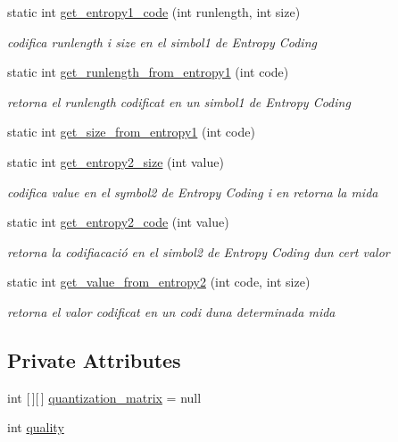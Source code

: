 \begin{DoxyCompactItemize}
static int \hyperlink{classdomini_1_1algorithm_1_1JPEG_a0f897c6c525d81551539df1eb8db7e12}{get\+\_\+entropy1\+\_\+code} (int runlength, int size)
\begin{DoxyCompactList}\small\item\em codifica runlength i size en el simbol1 de Entropy Coding \end{DoxyCompactList}\item 
static int \hyperlink{classdomini_1_1algorithm_1_1JPEG_ac58cb434a7acfd90fc8e548fd7c00ae2}{get\+\_\+runlength\+\_\+from\+\_\+entropy1} (int code)
\begin{DoxyCompactList}\small\item\em retorna el runlength codificat en un simbol1 de Entropy Coding \end{DoxyCompactList}\item 
static int \hyperlink{classdomini_1_1algorithm_1_1JPEG_a8d1005fb7833d36a064afb1c5e15bbd3}{get\+\_\+size\+\_\+from\+\_\+entropy1} (int code)
\item 
static int \hyperlink{classdomini_1_1algorithm_1_1JPEG_aa9bc9bee7181efee254be843e23ee2c6}{get\+\_\+entropy2\+\_\+size} (int value)
\begin{DoxyCompactList}\small\item\em codifica value en el symbol2 de Entropy Coding i en retorna la mida \end{DoxyCompactList}\item 
static int \hyperlink{classdomini_1_1algorithm_1_1JPEG_a0ccbcda5311dc96a30e5cb7f2a5b95b5}{get\+\_\+entropy2\+\_\+code} (int value)
\begin{DoxyCompactList}\small\item\em retorna la codifiacació en el simbol2 de Entropy Coding d\textquotesingle{}un cert valor \end{DoxyCompactList}\item 
static int \hyperlink{classdomini_1_1algorithm_1_1JPEG_a41c69fe2e29999dd17a555859df22530}{get\+\_\+value\+\_\+from\+\_\+entropy2} (int code, int size)
\begin{DoxyCompactList}\small\item\em retorna el valor codificat en un codi d\textquotesingle{}una determinada mida \end{DoxyCompactList}\end{DoxyCompactItemize}
\subsection*{Private Attributes}
\begin{DoxyCompactItemize}
\item 
int \mbox{[}$\,$\mbox{]}\mbox{[}$\,$\mbox{]} \hyperlink{classdomini_1_1algorithm_1_1JPEG_a7c95eb140dbe185a31b402d48ec17a66}{quantization\+\_\+matrix} = null
\item 
int \hyperlink{classdomini_1_1algorithm_1_1JPEG_ae80176d5ff56e613643db55e21c513da}{quality}
\end{DoxyCompactItemize}
